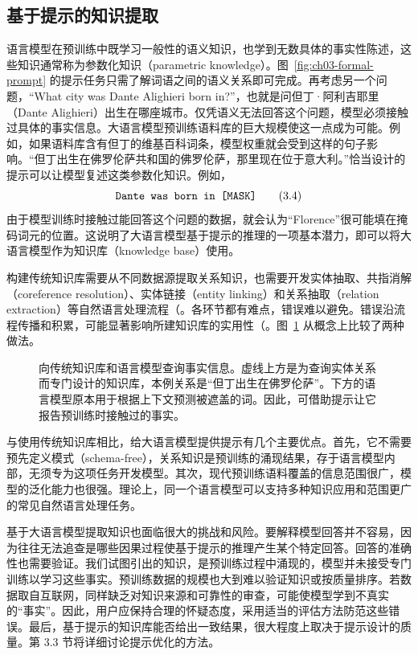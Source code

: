 \subsection{基于提示的知识提取}
语言模型在预训练中既学习一般性的语义知识，也学到无数具体的事实性陈述，这些知识通常称为参数化知识（parametric knowledge）。图~\ref{fig:ch03-formal-prompt} 的提示任务只需了解词语之间的语义关系即可完成。再考虑另一个问题，“What city was Dante Alighieri born in?”，也就是问但丁·阿利吉耶里（Dante Alighieri）出生在哪座城市。仅凭语义无法回答这个问题，模型必须接触过具体的事实信息。大语言模型预训练语料库的巨大规模使这一点成为可能。例如，如果语料库含有但丁的维基百科词条，模型权重就会受到这样的句子影响。“但丁出生在佛罗伦萨共和国的佛罗伦萨，那里现在位于意大利。”恰当设计的提示可以让模型复述这类参数化知识。例如，
\begin{equation}
\text{\ttfamily Dante was born in [MASK]}
\tag{3.4}
\end{equation}
由于模型训练时接触过能回答这个问题的数据，就会认为“Florence”很可能填在掩码词元的位置。这说明了大语言模型基于提示的推理的一项基本潜力，即可以将大语言模型作为知识库（knowledge base）使用。

构建传统知识库需要从不同数据源提取关系知识，也需要开发实体抽取、共指消解（coreference resolution）、实体链接（entity linking）和关系抽取（relation extraction）等自然语言处理流程（。各环节都有难点，错误难以避免。错误沿流程传播和积累，可能显著影响所建知识库的实用性（。图~\ref{fig:ch03-kb} 从概念上比较了两种做法。

\begin{figure}[!htbp]
\centering
\scalebox{.99}{}
\caption{向传统知识库和语言模型查询事实信息。虚线上方是为查询实体关系而专门设计的知识库，本例关系是“但丁出生在佛罗伦萨”。下方的语言模型原本用于根据上下文预测被遮盖的词。因此，可借助提示让它报告预训练时接触过的事实。}
\label{fig:ch03-kb}
\end{figure}

\begin{keypoint}
与使用传统知识库相比，给大语言模型提供提示有几个主要优点。首先，它不需要预先定义模式（schema-free），关系知识是预训练的涌现结果，存于语言模型内部，无须专为这项任务开发模型。其次，现代预训练语料覆盖的信息范围很广，模型的泛化能力也很强。理论上，同一个语言模型可以支持多种知识应用和范围更广的常见自然语言处理任务。
\end{keypoint}

\begin{practicaltip}
基于大语言模型提取知识也面临很大的挑战和风险。要解释模型回答并不容易，因为往往无法追查是哪些因果过程使基于提示的推理产生某个特定回答。回答的准确性也需要验证。我们试图引出的知识，是预训练过程中涌现的，模型并未接受专门训练以学习这些事实。预训练数据的规模也大到难以验证知识或按质量排序。若数据取自互联网，同样缺乏对知识来源和可靠性的审查，可能使模型学到不真实的“事实”。因此，用户应保持合理的怀疑态度，采用适当的评估方法防范这些错误。最后，基于提示的知识库能否给出一致结果，很大程度上取决于提示设计的质量。第 3.3 节将详细讨论提示优化的方法。
\end{practicaltip}

